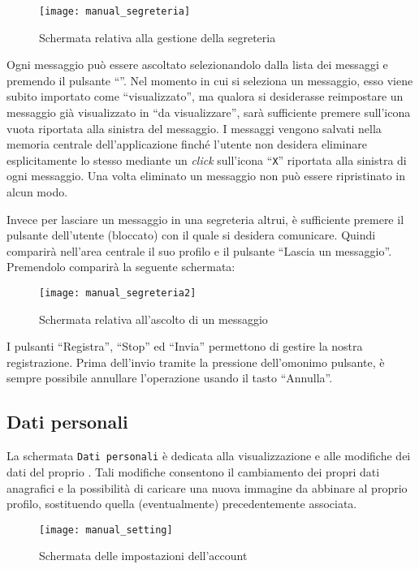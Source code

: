 \begin{figure}[H]
  \centering
  \texttt{[image: manual\_segreteria]}
\caption{Schermata relativa alla gestione della segreteria}\label{fig:manual_segreteria}
\end{figure}

Ogni messaggio può essere ascoltato selezionandolo dalla lista dei messaggi e premendo il pulsante ``''. Nel momento in cui si seleziona un messaggio, esso viene subito importato come ``visualizzato'', ma qualora si desiderasse reimpostare un messaggio già visualizzato in ``da visualizzare'', sarà sufficiente premere sull'icona vuota riportata alla sinistra del messaggio.
I messaggi vengono salvati nella memoria centrale dell'applicazione \caName{} finché l'utente non desidera eliminare esplicitamente lo stesso mediante un \textit{click} sull'icona ``\texttt{X}'' riportata alla sinistra di ogni messaggio. 
Una volta eliminato un messaggio non può essere ripristinato in alcun modo.

Invece per lasciare un messaggio in una segreteria altrui, è sufficiente premere il pulsante dell'utente (bloccato) con il quale si desidera comunicare. Quindi comparirà nell'area centrale il suo profilo e il pulsante ``Lascia un messaggio''. Premendolo comparirà la seguente schermata:

\begin{figure}[H]
  \centering
  \texttt{[image: manual\_segreteria2]}
\caption{Schermata relativa all'ascolto di un messaggio}\label{fig:manual_segreteria2}
\end{figure}

I pulsanti ``Registra'', ``Stop'' ed ``Invia'' permettono di gestire la nostra registrazione. Prima dell'invio tramite la pressione dell'omonimo pulsante, è sempre possibile annullare l'operazione usando il tasto ``Annulla''.

\clearpage
\subsection{Dati personali}
La schermata \texttt{Dati personali} è dedicata alla visualizzazione e alle modifiche dei dati del proprio . Tali modifiche consentono il cambiamento dei propri dati anagrafici e la possibilità di caricare una nuova immagine da abbinare al proprio profilo, sostituendo quella (eventualmente) precedentemente associata.

\begin{figure}[H]
  \centering
  \texttt{[image: manual\_setting]}
\caption{Schermata delle impostazioni dell'account}\label{fig:setting}
\end{figure}

